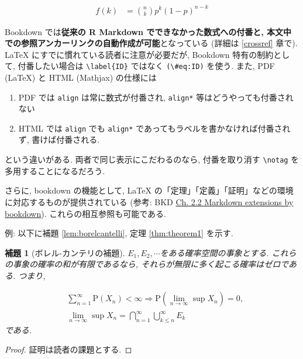 \documentclass[
  nomag]{bxjsbook}
\providecommand{\tightlist}{%
  \setlength{\itemsep}{0pt}\setlength{\parskip}{0pt}}
\newtheorem{lemma}{補題}[chapter]
\theoremstyle{definition}
\theoremstyle{definition}
\theoremstyle{definition}
\theoremstyle{remark}
\begin{document}
\begin{align}
f(k) &= {n \choose k} p^{k} (1-p)^{n-k} \label{eq:binom}
\end{align}

Bookdown では\textbf{従来の R Markdown でできなかった数式への付番と,
本文中での参照アンカーリンクの自動作成が可能}となっている (詳細は
\ref{crossref} 章で). LaTeX にすでに慣れている読者に注意が必要だが,
Bookdown 特有の制約として, 付番したい場合は
\texttt{\textbackslash{}label\{ID\}} ではなく
\texttt{(\textbackslash{}\#eq:ID)} を使う. また, PDF (LaTeX) と HTML
(Mathjax) の仕様には

\begin{enumerate}
\def\labelenumi{\arabic{enumi}.}
\tightlist
\item
  PDF では \texttt{align} は常に数式が付番され, \texttt{align*}
  等はどうやっても付番されない
\item
  HTML では \texttt{align} でも \texttt{align*}
  であってもラベルを書かなければ付番されず, 書けば付番される.
\end{enumerate}

という違いがある. 両者で同じ表示にこだわるのなら, 付番を取り消す
\texttt{\textbackslash{}notag} を多用することになるだろう.

さらに, bookdown の機能として, LaTeX
の「定理」「定義」「証明」などの環境に対応するものが提供されている
(参考: BKD
\href{https://bookdown.org/yihui/bookdown/markdown-extensions-by-bookdown.html}{Ch.
2.2 Markdown extensions by bookdown}). これらの相互参照も可能である.

例: 以下に補題 \ref{lem:borelcantelli}, 定理 \ref{thm:theorem1} を示す.

\begin{lemma}[ボレル-カンテリの補題]
\protect\hypertarget{lem:borelcantelli}{}{\label{lem:borelcantelli}
{}
}\({E_1,E_2,\cdots}\)をある確率空間の事象とする.
これらの事象の確率の和が有限であるなら,
それらが無限に多く起こる確率はゼロである. つまり,

\begin{align*}
& \sum_{n=1}^\infty \mathrm{P}(X_n) <\infty \Rightarrow \mathrm{P}\left(\lim_{n\to\infty}\sup X_n\right) = 0,\\
& \lim_{n\to\infty}\sup X_n = \bigcap_{n=1}^\infty\bigcup_{k\leq n}^\infty E_k
\end{align*}
である. \end{lemma}

\begin{proof}
{}証明は読者の課題とする. \end{proof}
\end{document}
